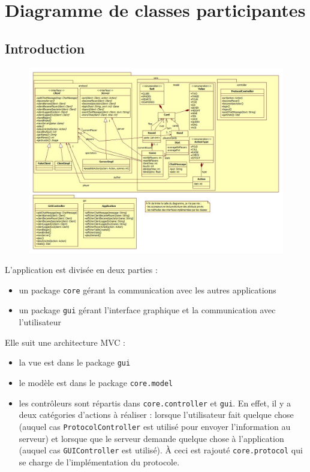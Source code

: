 \chapter{Diagramme de classes participantes}

\section{Introduction}

\begin{figure}[ht]
	\centering \includegraphics[width=1.50\linewidth, angle=90]{figures/ClassDiagram.jpg}
\end{figure}
\clearpage

L'application est divisée en deux parties :
\begin{itemize}
	\item un package \texttt{core} gérant la communication avec les autres applications
	\item un package \texttt{gui} gérant l'interface graphique et la communication avec l'utilisateur
\end{itemize}

Elle suit une architecture MVC :
\begin{itemize}
	\item la vue est dans le package \texttt{gui}
	\item le modèle est dans le package \texttt{core.model}
	\item les contrôleurs sont répartis dans \texttt{core.controller} et \texttt{gui}.
	En effet, il y a deux catégories d'actions à réaliser : lorsque l'utilisateur fait quelque chose (auquel cas \texttt{ProtocolController} est utilisé pour envoyer l'information au serveur) et lorsque que le serveur demande quelque chose à l'application (auquel cas \texttt{GUIController} est utilisé).
	À ceci est rajouté \texttt{core.protocol} qui se charge de l'implémentation du protocole.
\end{itemize}

